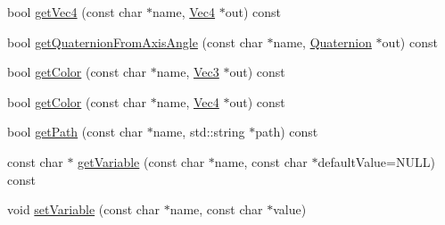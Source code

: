 \begin{DoxyCompactItemize}
\item 
bool \hyperlink{classProperties_a10f930a0553b781cb2de09c6b738f15e}{get\+Vec4} (const char $\ast$name, \hyperlink{classVec4}{Vec4} $\ast$out) const
\item 
bool \hyperlink{classProperties_a609e433cb5798c88b2f87ef036ed3a73}{get\+Quaternion\+From\+Axis\+Angle} (const char $\ast$name, \hyperlink{classQuaternion}{Quaternion} $\ast$out) const
\item 
bool \hyperlink{classProperties_aef61d49b456e4efbf6668a079b14780d}{get\+Color} (const char $\ast$name, \hyperlink{classVec3}{Vec3} $\ast$out) const
\item 
bool \hyperlink{classProperties_a8fd1e181c6cb58cda989db6eca09ef4d}{get\+Color} (const char $\ast$name, \hyperlink{classVec4}{Vec4} $\ast$out) const
\item 
bool \hyperlink{classProperties_a721bf4ef8c0669161a29068ab79fda90}{get\+Path} (const char $\ast$name, std\+::string $\ast$path) const
\item 
const char $\ast$ \hyperlink{classProperties_a8fca7902048c6e6af24c0f6697fcd2dd}{get\+Variable} (const char $\ast$name, const char $\ast$default\+Value=N\+U\+LL) const
\item 
void \hyperlink{classProperties_aea588dde95d1d4767d981a2530a202b0}{set\+Variable} (const char $\ast$name, const char $\ast$value)
\end{DoxyCompactItemize}
